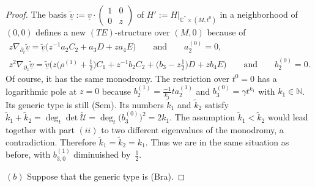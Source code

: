\documentclass[10pt,a4paper]{amsart}
\numberwithin{equation}{section}
\numberwithin{figure}{section}
\newcommand{\N}{{\mathbb N}}
\newcommand{\C}{{\mathbb C}}
\newcommand{\UU}{{\mathcal U}}
\newcommand{\www}{\widetilde}
\newcommand{\uuuu}{\underline}
\newcommand{\paa}{\partial}
\newcommand{\nnn}{\nabla}
\begin{document}
\begin{proof}
The basis $\uuuu{\www v}:= \uuuu{v}\cdot
\left(\begin{smallmatrix}1&0\\0&z\end{smallmatrix}\right)$ of
$H':=H|_{\C^*\times (M,t^0)}$ in a neighborhood of $(0,0)$
defines a new $(TE)$-structure over $(M,0)$ because of
\begin{gather*}%
z\nnn_{\paa_t}\uuuu{\www v}= \uuuu{\www v}
\bigl(z^{-1}a_2C_2+a_3D+za_4E\bigr)\qquad\text{and}\qquad a_2^{(0)}=0,
\\[1ex]
z^2\nnn_{\paa_z}\uuuu{\www v}= \uuuu{\www v}
\bigg(z\bigg(\rho^{(1)}+\frac{1}{2}\bigg)C_1+z^{-1}b_2C_2+\bigg(b_3-z\frac{1}{2}\bigg)D
+zb_4E\bigg)\qquad \text{and}\qquad b_2^{(0)}=0.
\end{gather*}
Of course, it has the same monodromy.
The restriction over $t^0=0$ has a logarithmic pole at $z=0$
because $b_2^{(1)}=\frac{-1}{k_1}ta_2^{(1)}$
and $b_3^{(0)}=\gamma t^{k_1}$ with $k_1\in\N$.
Its generic type is still (Sem).
Its numbers $\www k_1$ and $\www k_2$ satisfy
$\www k_1+\www k_2=\deg_t\det\www\UU=\deg_t\big(b_3^{(0)}\big)^2=2k_1$.
The assumption $\www k_1<\www k_2$ would lead together with
part $(ii)$ to two different eigenvalues of the monodromy,
a contradiction. Therefore $\www k_1=\www k_2=k_1$.
Thus we are in the same situation as before, with
$b_{3,0}^{(1)}$ diminuished by~$\frac{1}{2}$.


\medskip
$(b)$ Suppose that the generic type is (Bra).


\end{proof}
\end{document}

